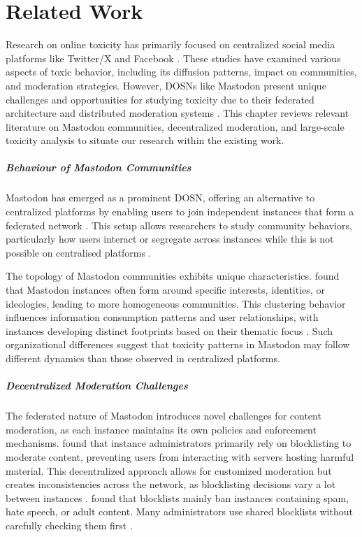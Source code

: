 \chapter{Related Work}

Research on online toxicity has primarily focused on centralized social media platforms like Twitter/X and Facebook \cite{fan:2022,nicholson:2023}. These studies have examined various aspects of toxic behavior, including its diffusion patterns, impact on communities, and moderation strategies. However, DOSNs like Mastodon present unique challenges and opportunities for studying toxicity due to their federated architecture and distributed moderation systems \cite{bono:2024}. This chapter reviews relevant literature on Mastodon communities, decentralized moderation, and large-scale toxicity analysis to situate our research within the existing work.

\paragraph{Behaviour of Mastodon Communities}
Mastodon has emerged as a prominent DOSN, offering an alternative to centralized platforms by enabling users to join independent instances that form a federated network \cite{zulli:2020}. This setup allows researchers to study community behaviors, particularly how users interact or segregate across instances while this is not possible on centralised platforms \cite{zignani:2018,zulli:2020}.

The topology of Mastodon communities exhibits unique characteristics. \citet{zulli:2020} found that Mastodon instances often form around specific interests, identities, or ideologies, leading to more homogeneous communities. This clustering behavior influences information consumption patterns and user relationships, with instances developing distinct footprints based on their thematic focus \cite{la_cava:2021}. Such organizational differences suggest that toxicity patterns in Mastodon may follow different dynamics than those observed in centralized platforms.

\paragraph{Decentralized Moderation Challenges}
The federated nature of Mastodon introduces novel challenges for content moderation, as each instance maintains its own policies and enforcement mechanisms. \citet{bono:2024} found that instance administrators primarily rely on blocklisting to moderate content, preventing users from interacting with servers hosting harmful material. This decentralized approach allows for customized moderation but creates inconsistencies across the network, as blocklisting decisions vary a lot between instances \cite{nicholson:2023}. \citet{nicholson:2023} found that blocklists mainly ban instances containing spam, hate speech, or adult content. Many administrators use shared blocklists without carefully checking them first \cite{bono:2024}.

